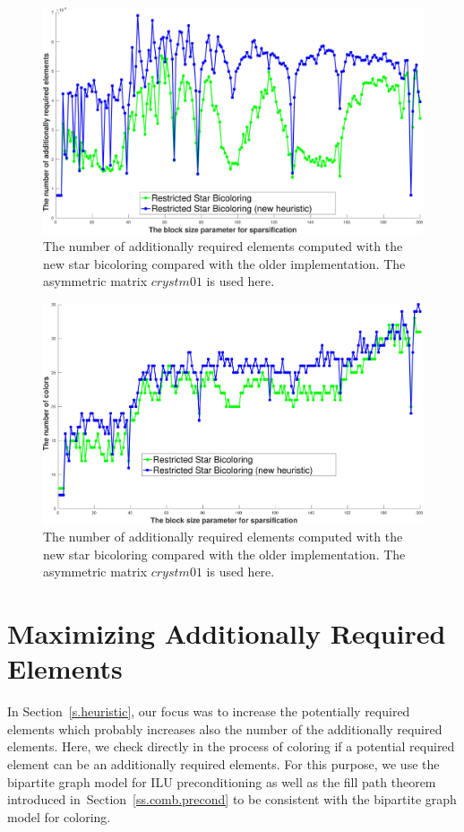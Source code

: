 \documentclass[11pt, twoside,a4paper]{book}
\newcommand{\secref}[1]{Section~\protect\ref{#1}}
\begin{document}
\begin{figure}
\includegraphics[width=\linewidth]{bls_adds_crystm01_old_star_vs_new}
\caption{The number of additionally required elements computed with
the new star bicoloring compared with the older implementation.
The asymmetric matrix \textit{$crystm01$} is used here.}
\label{bls_adds_crystm01_old_star_vs_new}
\end{figure}

\begin{figure}
\includegraphics[width=\linewidth]{bls_cols_crystm01_old_star_vs_new}
\caption{The number of additionally required elements computed with
the new star bicoloring compared with the older implementation.
The asymmetric matrix \textit{$crystm01$} is used here.}
\label{bls_cols_crystm01_old_star_vs_new}
\end{figure}
\section{Maximizing Additionally Required Elements}
\label{s.max.add.req}
In \secref{s.heuristic}, our focus was to increase the potentially required elements
which probably increases also the number of the additionally required elements.
Here, we check directly in the process of coloring
if a potential required element can be an additionally required elements.
For this purpose, we use the bipartite graph model for ILU preconditioning
as well as the fill path theorem introduced
in~\secref{ss.comb.precond} to be consistent with the bipartite graph model for coloring.
\end{document}

